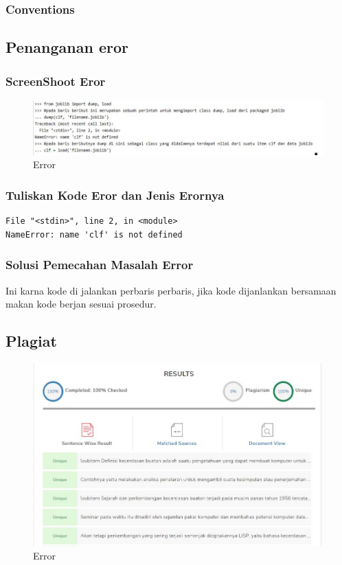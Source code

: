 \subsubsection{Conventions}



\subsection{Penanganan eror}
\subsubsection{ScreenShoot Eror}
\begin{figure}[ht]
\centering
\includegraphics[scale=0.5]{figures/1174042/chapter1/3,1.jpg}
\caption{Error}
\label{contoh}
\end{figure}

\subsubsection{Tuliskan Kode Eror dan Jenis Erornya}
\begin{verbatim}
File "<stdin>", line 2, in <module>
NameError: name 'clf' is not defined
\end{verbatim}


\subsubsection{Solusi Pemecahan Masalah Error}
Ini karna kode di jalankan perbaris perbaris, jika kode dijanlankan bersamaan makan kode berjan sesuai prosedur.

\subsection{Plagiat}
\begin{figure}[ht]
\centering
\includegraphics[scale=0.5]{figures/1174042/chapter1/5.jpg}
\caption{Error}
\label{contoh}
\end{figure}